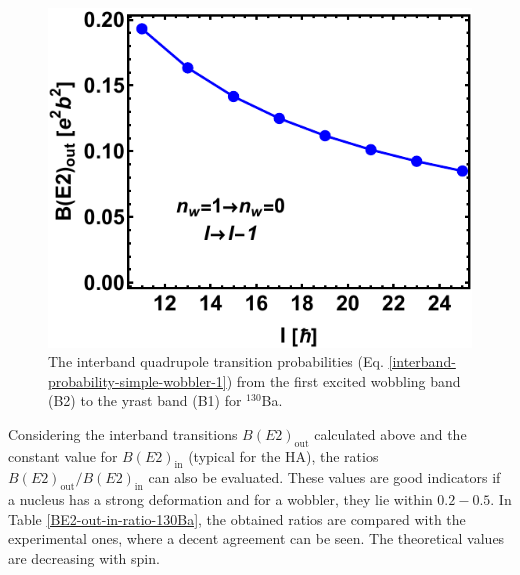 \begin{figure}
    \centering
    \includegraphics[scale=0.7]{Chapters/Figures/BE2-out-130Ba.pdf}
    \caption{The interband quadrupole transition probabilities (Eq. \ref{interband-probability-simple-wobbler-1}) from the first excited wobbling band (B2) to the yrast band (B1) for $^{130}$Ba.}
    \label{BE2out-transitions-130ba}
\end{figure}

Considering the interband transitions $B(E2)_\text{out}$ calculated above and the constant value for $B(E2)_\text{in}$ (typical for the HA), the ratios $B(E2)_\text{out}/B(E2)_\text{in}$ can also be evaluated. These values are good indicators if a nucleus has a strong deformation and for a wobbler, they lie within $0.2-0.5$. In Table \ref{BE2-out-in-ratio-130Ba}, the obtained ratios are compared with the experimental ones, where a decent agreement can be seen. The theoretical values are decreasing with spin.

